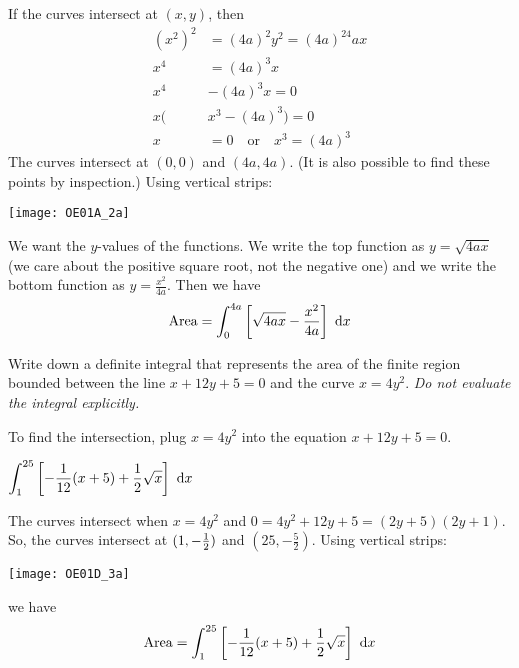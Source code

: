 \begin{solution}
If the curves intersect at $(x,y)$, then
\begin{align*}
\left(x^2\right)^2&=\left(4a\right)^2y^2 = (4a)^24ax\\
x^4&=(4a)^3 x\\
x^4&-(4a)^3x=0\\
x(&x^3-(4a)^3)=0\\
x&= 0 \quad\mbox{or}\quad x^3=(4a)^3
\end{align*}
The curves intersect at $(0,0)$ and $(4a,4a)$. (It is also possible to find these points by inspection.) Using vertical strips:
\begin{center}
       \texttt{[image: OE01A\_2a]}
\end{center}
We want the $y$-values of the functions. We write the top  function as $y =\sqrt{4ax}$ (we care about the positive square root, not the negative one) and we write the bottom function as $y=\frac{x^2}{4a}$.
Then we have
\begin{align*}
\text{Area} = \int_0^{4a}\left[\sqrt{4ax}-\frac{x^2}{4a}\right]\ \mathrm{d}x
\end{align*}

\end{solution}

\begin{Mquestion}[2001D]
Write down a definite integral that represents the
area of the finite region bounded between the line $x+12y+5=0$
and the curve  $x=4y^2$.
\emph{Do not evaluate the integral explicitly.}
\end{Mquestion}

\begin{hint}
To find the intersection, plug $x=4y^2$ into the equation $x+12y+5=0$.
\end{hint}

\begin{answer}
$\displaystyle\int_1^{25}\left[-\frac{1}{12}(x+5)+\frac{1}{2}\sqrt{x}\right]\ \dee{x}$
\end{answer}

\begin{solution}
The curves intersect when $x=4y^2$ and $0=4y^2+12y+5
=(2y+5)(2y+1)$. So, the curves intersect at $(1,-\tfrac{1}{2})$ and $(25,-\frac{5}{2})$.
Using vertical strips:
\begin{center}
       \texttt{[image: OE01D\_3a]}
\end{center}
we have
\begin{align*}
\text{Area} =
\int_1^{25}\left[-\frac{1}{12}(x+5)+\frac{1}{2}\sqrt{x}\right]\ \mathrm{d}x
\end{align*}

\end{solution}



